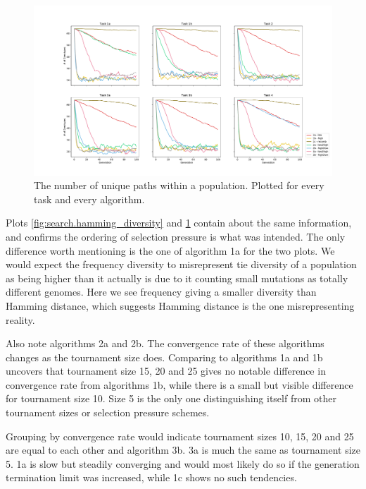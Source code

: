 \begin{figure}
    \includegraphics[width=1.2\textwidth,center]{Chapters/4.Experiments/exp2/figures/large/frequency_diversity_unique_path_count.pdf}
    \caption{The number of unique paths within a population. Plotted for every task and every algorithm.}
    \label{fig:search.frequency_diversity_unique}
\end{figure}

Plots \ref{fig:search.hamming_diversity} and \ref{fig:search.frequency_diversity_unique} contain about the same information, and confirms the ordering of selection pressure is what was intended. The only difference worth mentioning is the one of algorithm 1a for the two plots. We would expect the frequency diversity to misrepresent tie diversity of a population as being higher than it actually is due to it counting small mutations as totally different genomes. Here we see frequency giving a smaller diversity than Hamming distance, which suggests Hamming distance is the one misrepresenting reality. 

Also note algorithms 2a and 2b. The convergence rate of these algorithms changes as the tournament size does. Comparing to algorithms 1a and 1b uncovers that tournament size 15, 20 and 25 gives no notable difference in convergence rate from algorithms 1b, while there is a small but visible difference for tournament size 10. Size 5 is the only one distinguishing itself from other tournament sizes or selection pressure schemes. 

Grouping by convergence rate would indicate tournament sizes 10, 15, 20 and 25 are equal to each other and algorithm 3b. 3a is much the same as tournament size 5. 1a is slow but steadily converging and would most likely do so if the generation termination limit was increased, while 1c shows no such tendencies. 

